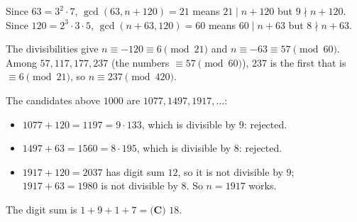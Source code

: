 Since $63=3^2\cdot7$, $\gcd(63,n+120)=21$ means $21\mid n+120$ but $9\nmid n+120$. Since $120=2^3\cdot3\cdot5$, $\gcd(n+63,120)=60$ means $60\mid n+63$ but $8\nmid n+63$.

The divisibilities give $n\equiv-120\equiv6\pmod{21}$ and $n\equiv-63\equiv57\pmod{60}$. Among $57,117,177,237$ (the numbers $\equiv57\pmod{60}$), $237$ is the first that is $\equiv6\pmod{21}$, so $n\equiv237\pmod{420}$.

The candidates above $1000$ are $1077,1497,1917,\dots$:
\begin{itemize}
\item $1077+120=1197=9\cdot133$, which is divisible by $9$: rejected.
\item $1497+63=1560=8\cdot195$, which is divisible by $8$: rejected.
\item $1917+120=2037$ has digit sum $12$, so it is not divisible by $9$; $1917+63=1980$ is not divisible by $8$. So $n=1917$ works.
\end{itemize}
The digit sum is $1+9+1+7=\boxed{\textbf{(C) }18}$.
